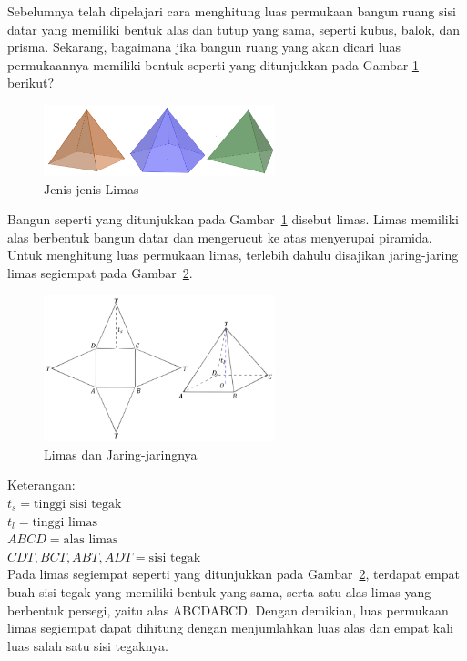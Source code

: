 \documentclass[12pt]{article}
\begin{document}
\begin{enumerate}
\begin{enumerate}
        \hspace*{1cm}Sebelumnya telah dipelajari cara menghitung luas permukaan bangun ruang sisi datar yang memiliki bentuk alas dan tutup yang sama, seperti kubus, balok, dan prisma. Sekarang, bagaimana jika bangun ruang yang akan dicari luas permukaannya memiliki bentuk seperti yang ditunjukkan pada Gambar \ref{jenislimas} berikut?
        \begin{figure}[H]
            \centering
            \includegraphics[width=0.6\textwidth]{images/jenislimas.png}
            \caption{Jenis-jenis Limas}
            \label{jenislimas}
        \end{figure}
        \hspace*{1cm}Bangun seperti yang ditunjukkan pada Gambar~\ref{jenislimas} disebut limas. Limas memiliki alas berbentuk bangun datar dan mengerucut ke atas menyerupai piramida. Untuk menghitung luas permukaan limas, terlebih dahulu disajikan jaring-jaring limas segiempat pada Gambar~\ref{limasdanjaring}.
        \begin{figure}[H]
            \centering
            \includegraphics[width=0.6\textwidth]{images/limasdanjaringnya.png}
            \caption{Limas dan Jaring-jaringnya}
            \label{limasdanjaring}
        \end{figure}
        Keterangan:\\
        $ t_s = \text{tinggi sisi tegak} $\\
        $ t_l = \text{tinggi limas} $\\
        $ ABCD = \text{alas limas} $\\
        $ CDT,BCT,ABT,ADT = \text{sisi tegak} $\\
        \hspace*{1cm}Pada limas segiempat seperti yang ditunjukkan pada Gambar~\ref{limasdanjaring}, terdapat empat buah sisi tegak yang memiliki bentuk yang sama, serta satu alas limas yang berbentuk persegi, yaitu alas ABCDABCD. Dengan demikian, luas permukaan limas segiempat dapat dihitung dengan menjumlahkan luas alas dan empat kali luas salah satu sisi tegaknya.

\end{enumerate}
\end{enumerate}
\end{document}
